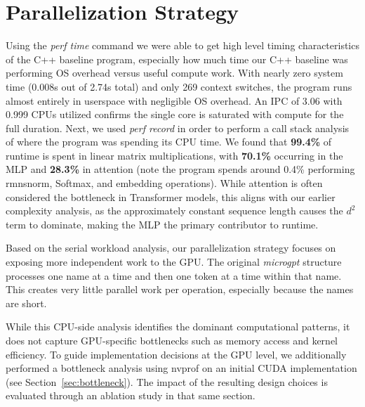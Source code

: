 \section{Parallelization Strategy}

Using the \textit{perf time} command we were able to get high level timing characteristics of the C++ baseline program, especially how much time our C++ baseline was performing OS overhead versus useful compute work. With nearly zero system time (0.008s out of 2.74s total) and only 269 context switches, the program runs almost entirely in userspace with negligible OS overhead. An IPC of 3.06 with 0.999 CPUs utilized confirms the single core is saturated with compute for the full duration. Next, we used \textit{perf record} in order to perform a call stack analysis of where the program was spending its CPU time. 
We found that \textbf{99.4\%} of runtime is spent in linear matrix multiplications, with \textbf{70.1\%} occurring in the MLP and \textbf{28.3\%} in attention (note the program spends around 0.4\% performing rmnsnorm, Softmax, and embedding operations). While attention is often considered the bottleneck in Transformer models, this aligns with our earlier complexity analysis, as the approximately constant sequence length causes the $d^2$ term to dominate, making the MLP the primary contributor to runtime.

Based on the serial workload analysis, our parallelization strategy focuses on exposing more independent work to the GPU. The original \textit{microgpt} structure processes one name at a time and then one token at a time within that name. 
This creates very little parallel work per operation, especially because the names are short.

While this CPU-side analysis identifies the dominant computational patterns, it does not capture GPU-specific bottlenecks such as memory access and kernel efficiency. To guide implementation decisions at the GPU level, we additionally performed a bottleneck analysis using nvprof on an initial CUDA implementation (see Section~\ref{sec:bottleneck}). The impact of the resulting design choices is evaluated through an ablation study in that same section.


